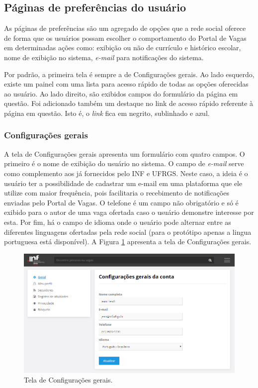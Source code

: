 \documentclass[cic,tc]{iiufrgs}
\begin{document}
\subsection{Páginas de preferências do usuário}
\label{PDVFunConfiguracoes}

As páginas de preferências são um agregado de opções que a rede social oferece de forma que os usuários possam escolher o comportamento do Portal de Vagas em determinadas ações como: exibição ou não de currículo e histórico escolar, nome de exibição no sistema, \textit{e-mail} para notificações do sistema.

Por padrão, a primeira tela é sempre a de Configurações gerais. Ao lado esquerdo, existe um painel com uma lista para acesso rápido de todas as opções oferecidas ao usuário. Ao lado direito, são exibidos campos do formulário da página em questão. Foi adicionado também um destaque no link de acesso rápido referente à página em questão. Isto é, o \textit{link} fica em negrito, sublinhado e azul.

\subsubsection{Configurações gerais}
\label{PDVFunConfiguracoesGeral}

A tela de Configurações gerais apresenta um formulário com quatro campos. O primeiro é o nome de exibição do usuário no sistema. O campo de \textit{e-mail} serve como complemento aos já fornecidos pelo INF e UFRGS. Neste caso, a ideia é o usuário ter a possibilidade de cadastrar um e-mail em uma plataforma que ele utilize com maior frequência, pois facilitaria o recebimento de notificações enviadas pelo Portal de Vagas. O telefone é um campo não obrigatório e só é exibido para o autor de uma vaga ofertada caso o usuário demonstre interesse por esta. Por fim, há o campo de idioma onde o usuário pode alternar entre as diferentes linguagens ofertadas pela rede social (para o protótipo apenas a lingua portuguesa está disponível). A Figura \ref{telaConfigGeral} apresenta a tela de Configurações gerais.

\begin{figure}[ht]
    \caption{Tela de Configurações gerais.}
        \begin{center}
            \includegraphics[width=1\textwidth]{figuras/config_01.png}
        \end{center}
    \label{telaConfigGeral}
\end{figure}
\end{document}
